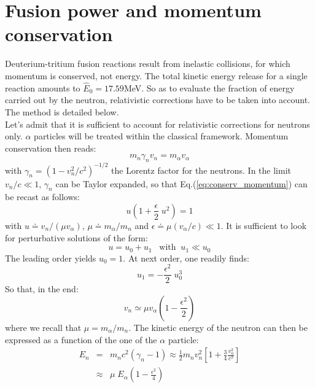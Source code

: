 \appendix
\chapter{Fusion power and momentum conservation}
\label{appendix:fusion_power}

Deuterium-tritium fusion reactions result from inelastic collisions, for which momentum is conserved, not energy. The total kinetic energy release for a single reaction amounts to $\hat E_0 = 17.59$MeV. So as to evaluate the fraction of energy carried out by the neutron, relativistic corrections have to be taken into account. The method is detailed below. \\

Let's admit that it is sufficient to account for relativistic corrections for neutrons only. $\alpha$ particles will be treated within the classical framework.
Momentum conservation then reads:
\begin{equation}
    m_n \gamma_n v_n = m_\alpha v_\alpha
    \label{eq:conserv_momentum}
\end{equation}
with $\gamma_n = (1-v_n^2/c^2)^{-1/2}$ the Lorentz factor for the neutrons. In the limit $v_n/c \ll1$,  $\gamma_n$ can be Taylor expanded, so that Eq.(\ref{eq:conserv_momentum}) can be recast as follows:
\begin{equation}
    u \left( 1+\frac{\epsilon}{2}\; u^2 \right) 
    = 1
    \label{eq:conserv_momentum2}
\end{equation}
with $u \doteq v_n/(\mu v_\alpha)$, $\mu \doteq m_\alpha/m_n$ and $\epsilon \doteq \mu (v_\alpha/c)\ll1$. It is sufficient to look for perturbative solutions of the form: 
$$ u = u_0 + u_1 \;\;\; \textrm{with} \;\; u_1\ll u_0 $$
The leading order yields $u_0=1$. At next order, one readily finds:
$$ u_1 = -\frac{\epsilon^2}{2} \; u_0^3 $$
So that, in the end:
\begin{equation*}
    v_n \simeq \mu v_\alpha \left( 1-\frac{\epsilon^2}{2}\right)
\end{equation*}
where we recall that $\mu=m_\alpha/m_n$.
The kinetic energy of the neutron can then be expressed as a function of the one of the $\alpha$ particle:
\begin{eqnarray*}
    E_n &=& m_nc^2(\gamma_n-1) \approx 
    \frac{1}{2} m_nv_n^2\left[ 1+ \frac{3}{4}\frac{v_n^2}{c^2}\right] \nonumber \\
    &\approx& \mu\; E_\alpha \left( 1-\frac{\epsilon^2}{4}\right)
\end{eqnarray*}

